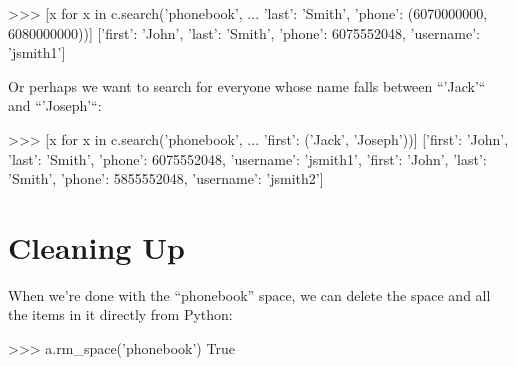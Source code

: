 \begin{pythoncode}
   >>> [x for x in c.search('phonebook',
   ...  {'last': 'Smith', 'phone': (6070000000, 6080000000)})]
   [{'first': 'John',
     'last': 'Smith',
     'phone': 6075552048,
     'username': 'jsmith1'}]
\end{pythoncode}

Or perhaps we want to search for everyone whose name falls between ``'Jack'``
and ``'Joseph'``:

\begin{pythoncode}
>>> [x for x in c.search('phonebook',
...  {'first': ('Jack', 'Joseph')})]
[{'first': 'John',
  'last': 'Smith',
  'phone': 6075552048,
  'username': 'jsmith1'},
 {'first': 'John',
  'last': 'Smith',
  'phone': 5855552048,
  'username': 'jsmith2'}]
\end{pythoncode}

\section{Cleaning Up}
\label{sec:quick-start:cleanup}

When we're done with the ``phonebook'' space, we can delete the space and all
the items in it directly from Python:

\begin{pythoncode}
>>> a.rm_space('phonebook')
True
\end{pythoncode}
